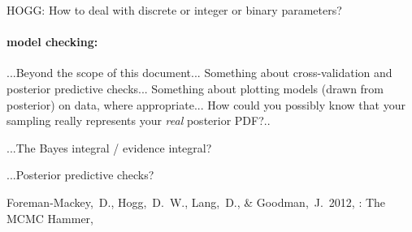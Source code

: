 \documentclass[12pt,twoside,pdftex]{article}
\begin{document}
HOGG:  How to deal with discrete or integer or binary parameters?

\paragraph{model checking:}
...Beyond the scope of this document...
Something about cross-validation and posterior predictive checks...
Something about plotting models (drawn from posterior) on data, where appropriate...
How could you possibly know that your sampling really represents your \emph{real} posterior PDF?..

...The Bayes integral / evidence integral?

...Posterior predictive checks?









\clearpage
{}\theendnotes

\clearpage
\begin{thebibliography}{}
  Foreman-Mackey,~D., Hogg,~D.~W., Lang,~D., \& Goodman,~J.\ 2012,
  : The MCMC Hammer,
\end{thebibliography}
\end{document}
